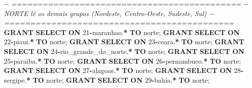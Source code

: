 \documentclass[
]{book}
\newenvironment{Shaded}{\begin{snugshade}}{\end{snugshade}}
\newcommand{\CommentTok}[1]{\textcolor[rgb]{0.56,0.35,0.01}{\textit{#1}}}
\newcommand{\DecValTok}[1]{\textcolor[rgb]{0.00,0.00,0.81}{#1}}
\newcommand{\KeywordTok}[1]{\textcolor[rgb]{0.13,0.29,0.53}{\textbf{#1}}}
\newcommand{\NormalTok}[1]{#1}
\newcommand{\OperatorTok}[1]{\textcolor[rgb]{0.81,0.36,0.00}{\textbf{#1}}}
\newcommand{\StringTok}[1]{\textcolor[rgb]{0.31,0.60,0.02}{#1}}
\begin{document}
\begin{Shaded}
\begin{Highlighting}[]
\CommentTok{{-}{-} ============================================}
\CommentTok{{-}{-} NORTE lê os demais grupos (Nordeste, Centro{-}Oeste, Sudeste, Sul)}
\CommentTok{{-}{-} ============================================}
\KeywordTok{GRANT} \KeywordTok{SELECT} \KeywordTok{ON}\NormalTok{ \textasciigrave{}}\DecValTok{21}\OperatorTok{{-}}\NormalTok{maranhao\textasciigrave{}.}\OperatorTok{*}            \KeywordTok{TO} \StringTok{\textquotesingle{}norte\textquotesingle{}}\NormalTok{;}
\KeywordTok{GRANT} \KeywordTok{SELECT} \KeywordTok{ON}\NormalTok{ \textasciigrave{}}\DecValTok{22}\OperatorTok{{-}}\NormalTok{piaui\textasciigrave{}.}\OperatorTok{*}               \KeywordTok{TO} \StringTok{\textquotesingle{}norte\textquotesingle{}}\NormalTok{;}
\KeywordTok{GRANT} \KeywordTok{SELECT} \KeywordTok{ON}\NormalTok{ \textasciigrave{}}\DecValTok{23}\OperatorTok{{-}}\NormalTok{ceara\textasciigrave{}.}\OperatorTok{*}               \KeywordTok{TO} \StringTok{\textquotesingle{}norte\textquotesingle{}}\NormalTok{;}
\KeywordTok{GRANT} \KeywordTok{SELECT} \KeywordTok{ON}\NormalTok{ \textasciigrave{}}\DecValTok{24}\OperatorTok{{-}}\NormalTok{rio\_grande\_do\_norte\textasciigrave{}.}\OperatorTok{*} \KeywordTok{TO} \StringTok{\textquotesingle{}norte\textquotesingle{}}\NormalTok{;}
\KeywordTok{GRANT} \KeywordTok{SELECT} \KeywordTok{ON}\NormalTok{ \textasciigrave{}}\DecValTok{25}\OperatorTok{{-}}\NormalTok{paraiba\textasciigrave{}.}\OperatorTok{*}             \KeywordTok{TO} \StringTok{\textquotesingle{}norte\textquotesingle{}}\NormalTok{;}
\KeywordTok{GRANT} \KeywordTok{SELECT} \KeywordTok{ON}\NormalTok{ \textasciigrave{}}\DecValTok{26}\OperatorTok{{-}}\NormalTok{pernambuco\textasciigrave{}.}\OperatorTok{*}          \KeywordTok{TO} \StringTok{\textquotesingle{}norte\textquotesingle{}}\NormalTok{;}
\KeywordTok{GRANT} \KeywordTok{SELECT} \KeywordTok{ON}\NormalTok{ \textasciigrave{}}\DecValTok{27}\OperatorTok{{-}}\NormalTok{alagoas\textasciigrave{}.}\OperatorTok{*}             \KeywordTok{TO} \StringTok{\textquotesingle{}norte\textquotesingle{}}\NormalTok{;}
\KeywordTok{GRANT} \KeywordTok{SELECT} \KeywordTok{ON}\NormalTok{ \textasciigrave{}}\DecValTok{28}\OperatorTok{{-}}\NormalTok{sergipe\textasciigrave{}.}\OperatorTok{*}             \KeywordTok{TO} \StringTok{\textquotesingle{}norte\textquotesingle{}}\NormalTok{;}
\KeywordTok{GRANT} \KeywordTok{SELECT} \KeywordTok{ON}\NormalTok{ \textasciigrave{}}\DecValTok{29}\OperatorTok{{-}}\NormalTok{bahia\textasciigrave{}.}\OperatorTok{*}               \KeywordTok{TO} \StringTok{\textquotesingle{}norte\textquotesingle{}}\NormalTok{;}

\end{Highlighting}
\end{Shaded}
\end{document}
